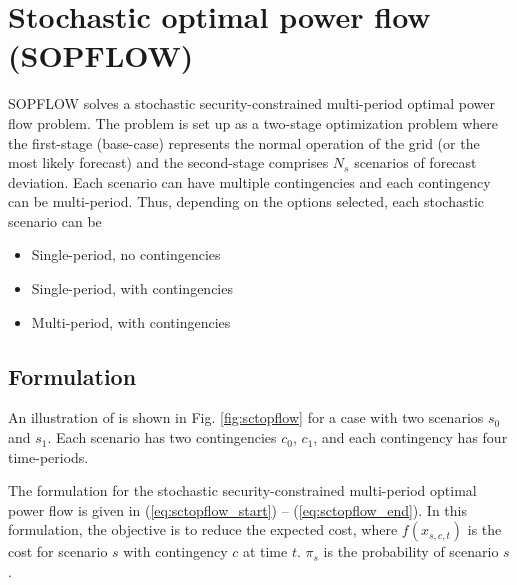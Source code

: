 \chapter{Stochastic optimal power flow (SOPFLOW)}\label{chap:sopflow}
SOPFLOW solves a stochastic security-constrained multi-period optimal power flow problem. The problem is set up as a two-stage optimization problem where the first-stage (base-case) represents the normal operation of the grid (or the most likely forecast) and the second-stage comprises $N_s$ scenarios of forecast deviation. Each scenario can have multiple contingencies and each contingency can be multi-period. Thus, depending on the options selected, each stochastic scenario can be
\begin{itemize}
    \item Single-period, no contingencies
    \item Single-period, with contingencies
    \item Multi-period, with contingencies
\end{itemize}

\section{Formulation}
An illustration of \sopflow is shown in Fig. \ref{fig:sctopflow} for a case with two scenarios $s_0$ and $s_1$. Each scenario has two contingencies $c_0$, $c_1$, and each contingency has four time-periods.



The formulation for the stochastic security-constrained multi-period optimal power flow is given in (\ref{eq:sctopflow_start}) -- (\ref{eq:sctopflow_end}). In this formulation, the objective is to reduce the expected cost, where $f(x_{s,c,t})$ is the cost for scenario $s$ with contingency $c$ at time $t$. $\pi_s$ is the probability of scenario $s$.

